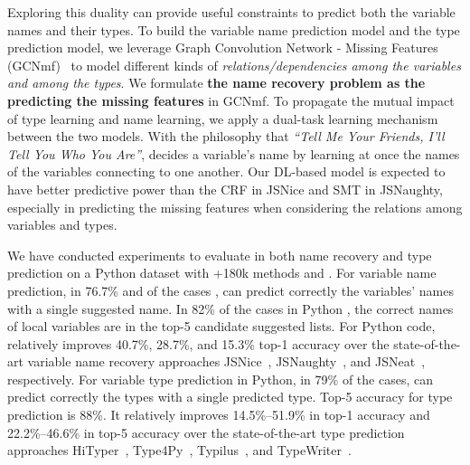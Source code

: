 %

Exploring this duality can provide useful constraints to predict both
the variable names and their types.  To build the variable name
prediction model and the type prediction model, we leverage Graph
Convolution Network - Missing Features (GCNmf)~\cite{GCNmf} to model
different kinds of {\em relations/dependencies among the variables and
  among the types}. We formulate {\bf the name recovery problem as the
  predicting the missing features} in GCNmf. To propagate the mutual
impact of type learning and name learning, we apply a dual-task
learning mechanism between the two models.
%
With the philosophy that {\em ``Tell Me Your Friends, I'll Tell You Who
  You Are''}, {\tool} decides a variable's name by learning at once
the names of the variables connecting to one another.
%
Our DL-based model is expected to have better predictive power than
the CRF in JSNice and SMT in JSNaughty, especially in predicting the
missing features when considering the relations among variables and
types.

We have conducted experiments to evaluate {\tool} in both name
recovery and type prediction on a Python dataset with +180k methods
and {\color{blue}{and a JavaScript (JS) dataset with 322k
    files}}. For variable name prediction, in 76.7\% and
{\color{blue}{79.9\%}} of the cases {\color{blue}{in Python and JS
    code respectively}}, {\tool} can predict correctly the variables'
names with a single suggested name. In 82\% {\color{blue}{and 83.3\%}}
of the cases in Python {\color{blue}{and JS code}}, the correct names of local variables are in the top-5 candidate suggested lists. For Python code, {\tool}
relatively improves 40.7\%, 28.7\%, and 15.3\% top-1 accuracy over the
state-of-the-art variable name recovery approaches
JSNice~\cite{JSNice2015}, JSNaughty~\cite{JSNaughty2017}, and
JSNeat~\cite{icse19}, respectively.
%
{\color{blue}{For JS code, the relative improvements over those baselines are 46.6\%,
    34.0\%, and 5.4\%, respectively.}} For variable type prediction
in Python, in 79\% of the cases, {\tool} can predict correctly the
types with a single predicted type. Top-5 accuracy for type prediction
is 88\%. It relatively improves 14.5\%--51.9\% in top-1 accuracy and
22.2\%--46.6\% in top-5 accuracy over the state-of-the-art type
prediction approaches HiTyper~\cite{HiTyper-icse22},
Type4Py~\cite{Type4Py-icse22}, Typilus~\cite{typilus-pldi20}, and
TypeWriter~\cite{typewriter-fse20}.

